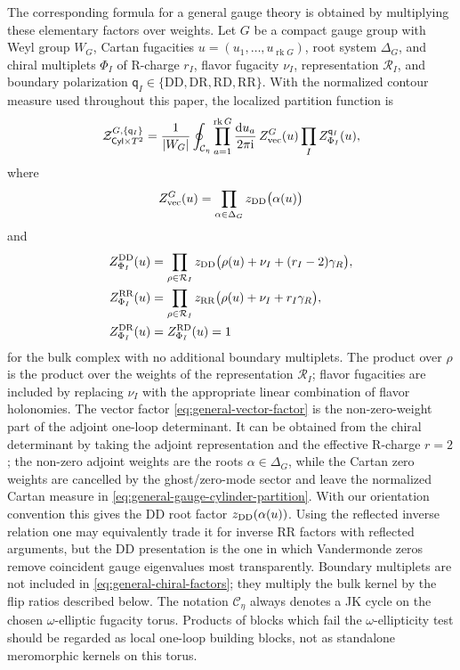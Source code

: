 \documentclass[11pt,a4paper]{article}
\numberwithin{equation}{section}
\theoremstyle{plain}
\theoremstyle{definition}
\theoremstyle{remark}
\newcommand{\ii}{\mathrm{i}}
\newcommand{\dd}{\mathrm{d}}
\newcommand{\nn}{\nonumber}
\newcommand{\cyl}{\mathsf{Cyl}}
\begin{document}
The corresponding formula for a general gauge theory is obtained by multiplying these elementary factors over weights.  Let \(G\) be a compact gauge group with Weyl group \(W_G\), Cartan fugacities \(u=(u_1,\ldots,u_{\operatorname{rk}G})\), root system \(\Delta_G\), and chiral multiplets \(\Phi_I\) of R-charge \(r_I\), flavor fugacity \(\nu_I\), representation \(\mathcal R_I\), and boundary polarization \(\mathsf q_I\in\{\mathrm{DD},\mathrm{DR},\mathrm{RD},\mathrm{RR}\}\).  With the normalized contour measure used throughout this paper, the localized partition function is
\begin{equation}
\mathcal Z_{\cyl\times T^2}^{G,\{\mathsf q_I\}}
=
\frac{1}{|W_G|}
\oint_{\mathcal C_\eta}
\prod_{a=1}^{\operatorname{rk}G}\frac{\dd u_a}{2\pi\ii}\,
Z_{\rm vec}^{G}(u)\prod_I Z_{\Phi_I}^{\mathsf q_I}(u),
\label{eq:general-gauge-cylinder-partition}
\end{equation}
where
\begin{equation}
Z_{\rm vec}^{G}(u)=\prod_{\alpha\in\Delta_G}z_{\rm DD}\big(\alpha(u)\big)
\label{eq:general-vector-factor}
\end{equation}
and
\begin{align}
Z_{\Phi_I}^{\mathrm{DD}}(u)
&=
\prod_{\rho\in\mathcal R_I}
z_{\rm DD}\big(\rho(u)+\nu_I+(r_I-2)\gamma_R\big),
\nn\\
Z_{\Phi_I}^{\mathrm{RR}}(u)
&=
\prod_{\rho\in\mathcal R_I}
z_{\rm RR}\big(\rho(u)+\nu_I+r_I\gamma_R\big),
\nn\\
Z_{\Phi_I}^{\mathrm{DR}}(u)&=Z_{\Phi_I}^{\mathrm{RD}}(u)=1
\label{eq:general-chiral-factors}
\end{align}
for the bulk complex with no additional boundary multiplets.  The product over \(\rho\) is the product over the weights of the representation \(\mathcal R_I\); flavor fugacities are included by replacing \(\nu_I\) with the appropriate linear combination of flavor holonomies.  The vector factor \eqref{eq:general-vector-factor} is the non-zero-weight part of the adjoint one-loop determinant.  It can be obtained from the chiral determinant by taking the adjoint representation and the effective R-charge \(r=2\); the non-zero adjoint weights are the roots \(\alpha\in\Delta_G\), while the Cartan zero weights are cancelled by the ghost/zero-mode sector and leave the normalized Cartan measure in \eqref{eq:general-gauge-cylinder-partition}.  With our orientation convention this gives the DD root factor \(z_{\rm DD}(\alpha(u))\).  Using the reflected inverse relation one may equivalently trade it for inverse RR factors with reflected arguments, but the DD presentation is the one in which Vandermonde zeros remove coincident gauge eigenvalues most transparently.  Boundary multiplets are not included in \eqref{eq:general-chiral-factors}; they multiply the bulk kernel by the flip ratios described below.  The notation \(\mathcal C_\eta\) always denotes a JK cycle on the chosen \(\omega\)-elliptic fugacity torus.  Products of blocks which fail the \(\omega\)-ellipticity test should be regarded as local one-loop building blocks, not as standalone meromorphic kernels on this torus.
\end{document}

